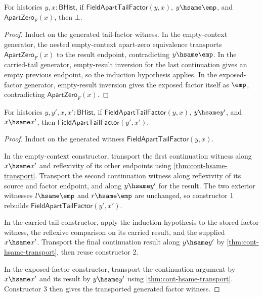 \begin{lemma}
\label{lem:field-apartzero-tail-factor-empty-endpoint-exclusion}
For histories $y,x:\mathsf{BHist}$, if
$\mathsf{FieldApartTailFactor}(y,x)$, $y\hsame\emp$, and
$\mathsf{ApartZero}_F(x)$, then $\bot$.
\end{lemma}
\begin{proof}
Induct on the generated tail-factor witness. In the empty-context generator,
the nested empty-context apart-zero equivalence transports
$\mathsf{ApartZero}_F(x)$ to the result endpoint, contradicting
$y\hsame\emp$. In the carried-tail generator, empty-result inversion for the
last continuation gives an empty previous endpoint, so the induction
hypothesis applies. In the exposed-factor generator, empty-result inversion
gives the exposed factor itself as $\emp$, contradicting
$\mathsf{ApartZero}_F(x)$.
\end{proof}

\begin{lemma}
\label{lem:field-apartzero-tail-factor-hsame-transport}
For histories $y,y',x,x':\mathsf{BHist}$, if
$\mathsf{FieldApartTailFactor}(y,x)$, $y\hsame y'$, and $x\hsame x'$, then
$\mathsf{FieldApartTailFactor}(y',x')$.
\end{lemma}
\begin{proof}
Induct on the generated witness
$\mathsf{FieldApartTailFactor}(y,x)$.

In the empty-context constructor, transport the first continuation witness along
$x\hsame x'$ and reflexivity of its other endpoints using
\autoref{thm:cont-hsame-transport}. Transport the second continuation witness
along reflexivity of its source and factor endpoint, and along $y\hsame y'$ for
the result. The two exterior witnesses $l\hsame\emp$ and $r\hsame\emp$ are
unchanged, so constructor 1 rebuilds
$\mathsf{FieldApartTailFactor}(y',x')$.

In the carried-tail constructor, apply the induction hypothesis to the stored
factor witness, the reflexive comparison on its carried result, and the supplied
$x\hsame x'$. Transport the final continuation result along $y\hsame y'$ by
\autoref{thm:cont-hsame-transport}, then reuse constructor 2.

In the exposed-factor constructor, transport the continuation argument by
$x\hsame x'$ and its result by $y\hsame y'$ using
\autoref{thm:cont-hsame-transport}. Constructor 3 then gives the transported
generated factor witness.
\end{proof}

